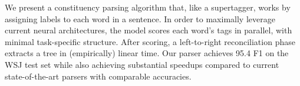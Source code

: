 We present  a  constituency  parsing  algorithm that, like a supertagger, works by assigning labels  to  each  word  in  a  sentence.  In order to maximally leverage current neural architectures, the model scores each word's tags in parallel, with minimal task-specific structure.  After scoring, a left-to-right reconciliation phase extracts a tree in (empirically) linear time.  Our parser achieves 95.4 F1 on the WSJ test set while also achieving substantial speedups compared to current state-of-the-art parsers with comparable accuracies.
